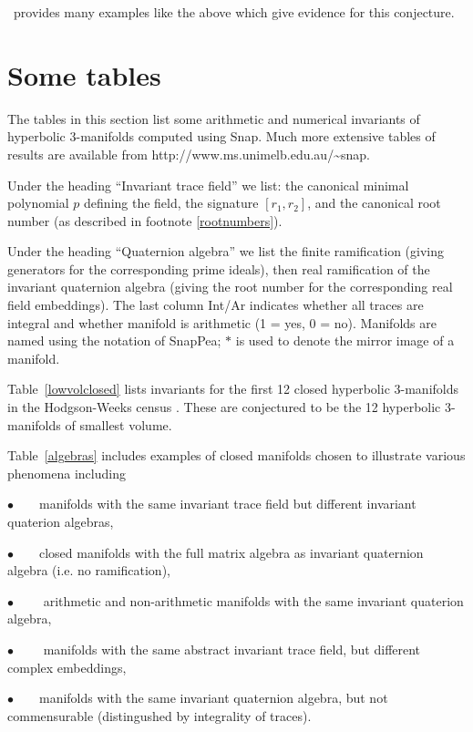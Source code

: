 \documentclass[a4paper]{amsart}
\theoremstyle{definition}
\begin{document}
\snap\ provides many examples like the above which 
give evidence for this conjecture.

\section{Some tables}\label{tables}

The tables in this section list some arithmetic and numerical invariants
of hyperbolic 3-manifolds computed using Snap. Much more extensive tables of
results are available from http://www.ms.unimelb.edu.au/\~{}snap.

Under the heading ``Invariant trace field'' we list:
the canonical minimal polynomial $p$ defining the field,
the signature $[r_1,r_2]$, and the canonical root
number (as described in footnote \ref{rootnumbers}).

Under the heading ``Quaternion algebra'' we list the
finite ramification (giving generators for the corresponding
prime ideals), then real ramification of the
invariant quaternion algebra (giving the root number for the
corresponding real field embeddings). 
The last column Int/Ar indicates whether all
traces are integral and whether manifold is arithmetic
(1 = yes, 0 = no).
Manifolds are named using the notation of SnapPea;
$*$ is used to denote the mirror image of a manifold.


Table~\ref{lowvolclosed} lists invariants for the first 12 closed hyperbolic
3-manifolds in the Hodgson-Weeks census \cite{Ho-We}. These are conjectured 
to be the 12 hyperbolic 3-manifolds of smallest volume.


Table~\ref{algebras} includes examples of closed manifolds
chosen to illustrate various phenomena including

\noindent$\bullet$~~~~manifolds with the same invariant trace field
but different invariant quaterion algebras,

\noindent$\bullet$~~~~closed manifolds with the full matrix
algebra as invariant quaternion algebra (i.e. no ramification),

\noindent$\bullet$~~~~ arithmetic and non-arithmetic manifolds with the
same invariant quaterion algebra,

\noindent$\bullet$~~~~ manifolds with the same abstract invariant trace field, 
but different complex embeddings,

\noindent$\bullet$~~~~manifolds with the same invariant quaternion algebra,
but not commensurable (distingushed by integrality of traces).
\end{document}
